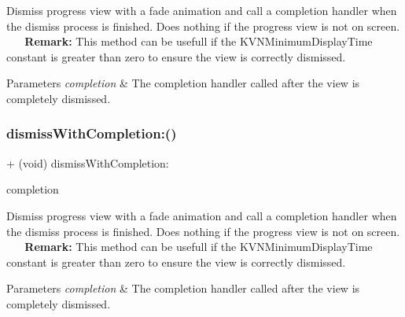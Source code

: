Dismiss progress view with a fade animation and call a completion handler when the dismiss process is finished. Does nothing if the progress view is not on screen. ~\newline
~\newline
{\bfseries Remark\+:} This method can be usefull if the {\ttfamily K\+V\+N\+Minimum\+Display\+Time} constant is greater than zero to ensure the view is correctly dismissed. 
\begin{DoxyParams}{Parameters}
{\em completion} & The completion handler called after the view is completely dismissed. \\
\hline
\end{DoxyParams}
\mbox{\label{interface_k_v_n_progress_a7ec9c844ebb26d0f9cdff6ef3d737d28}} 
\subsubsection{\texorpdfstring{dismiss\+With\+Completion\+:()}{dismissWithCompletion:()}\hspace{0.1cm}{\footnotesize\ttfamily [3/3]}}
{\footnotesize\ttfamily + (void) dismiss\+With\+Completion\+: \begin{DoxyParamCaption}\item[{(K\+V\+N\+Completion\+Block)}]{completion }\end{DoxyParamCaption}}

Dismiss progress view with a fade animation and call a completion handler when the dismiss process is finished. Does nothing if the progress view is not on screen. ~\newline
~\newline
{\bfseries Remark\+:} This method can be usefull if the {\ttfamily K\+V\+N\+Minimum\+Display\+Time} constant is greater than zero to ensure the view is correctly dismissed. 
\begin{DoxyParams}{Parameters}
{\em completion} & The completion handler called after the view is completely dismissed. \\
\hline
\end{DoxyParams}
\mbox{\label{interface_k_v_n_progress_a28dddb521ec06e907b8cc436b34e71cb}} 
